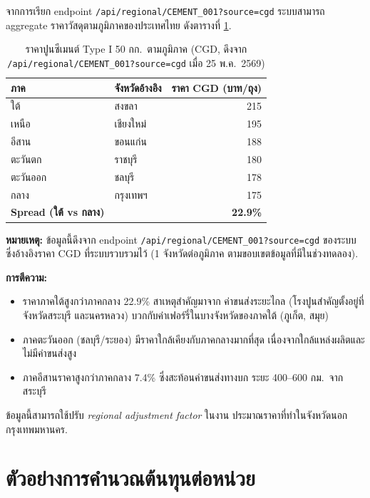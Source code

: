 จากการเรียก endpoint \texttt{/api/regional/CEMENT\_001?source=cgd}
ระบบสามารถ aggregate ราคาวัสดุตามภูมิภาคของประเทศไทย ดังตารางที่
\ref{tab:regional}.

\begin{table}[H]
\centering
\caption{ราคาปูนซีเมนต์ Type I 50 กก.\ ตามภูมิภาค (CGD, ดึงจาก \texttt{/api/regional/CEMENT\_001?source=cgd} เมื่อ 25 พ.ค.\ 2569)}
\label{tab:regional}
\begin{tabularx}{\textwidth}{l l r}
\toprule
\textbf{ภาค} & \textbf{จังหวัดอ้างอิง} & \textbf{ราคา CGD (บาท/ถุง)} \\
\midrule
ใต้           & สงขลา      & 215 \\
เหนือ         & เชียงใหม่   & 195 \\
อีสาน         & ขอนแก่น    & 188 \\
ตะวันตก       & ราชบุรี    & 180 \\
ตะวันออก      & ชลบุรี     & 178 \\
กลาง          & กรุงเทพฯ   & 175 \\
\midrule
\textbf{Spread (ใต้ vs กลาง)} & & \textbf{22.9\%} \\
\bottomrule
\end{tabularx}
\end{table}

\textbf{หมายเหตุ:} ข้อมูลนี้ดึงจาก endpoint \texttt{/api/regional/CEMENT\_001?source=cgd} ของระบบ ซึ่งอ้างอิงราคา CGD ที่ระบบรวบรวมไว้ (1 จังหวัดต่อภูมิภาค ตามขอบเขตข้อมูลที่มีในช่วงทดลอง).



\textbf{การตีความ:}
\begin{itemize}[leftmargin=2em]
  \item ราคาภาคใต้สูงกว่าภาคกลาง 22.9\% สาเหตุสำคัญมาจาก
        ค่าขนส่งระยะไกล (โรงปูนสำคัญตั้งอยู่ที่จังหวัดสระบุรี
        และนครหลวง) บวกกับค่าเฟอร์รี่ในบางจังหวัดของภาคใต้
        (ภูเก็ต, สมุย)
  \item ภาคตะวันออก (ชลบุรี/ระยอง) มีราคาใกล้เคียงกับภาคกลางมากที่สุด
        เนื่องจากใกล้แหล่งผลิตและไม่มีค่าขนส่งสูง
  \item ภาคอีสานราคาสูงกว่าภาคกลาง 7.4\% ซึ่งสะท้อนค่าขนส่งทางบก
        ระยะ 400--600 กม.\ จากสระบุรี
\end{itemize}

ข้อมูลนี้สามารถใช้ปรับ \emph{regional adjustment factor} ในงาน
ประมาณราคาที่ทำในจังหวัดนอกกรุงเทพมหานคร.

\section{ตัวอย่างการคำนวณต้นทุนต่อหน่วย}
\label{sec:boq-result}

